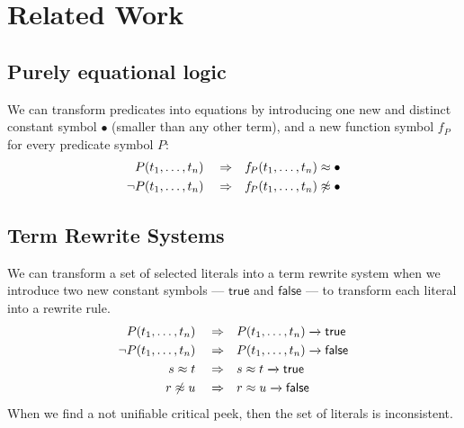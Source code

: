 
\chapter{Related Work}


\section{Purely equational logic}

We can transform predicates into equations
by introducing one new and distinct constant symbol \( \bullet \) (smaller than any other term),
and a new function symbol \( f\!_P \) for every predicate symbol \( P \):
\begin{align*}
	P(t_1,\ldots,t_n) \quad\Rightarrow&\quad f\!_P(t_1,\ldots,t_n) \approx \bullet \\
	\lnot P(t_1,\ldots,t_n) \quad\Rightarrow&\quad f\!_P(t_1,\ldots,t_n) \not\approx \bullet
\end{align*}

\section{Term Rewrite Systems}

We can transform a set of selected literals into a term rewrite system
when we introduce two new constant symbols --- \( \mathsf{true} \) and \( \mathsf{false} \) ---
to transform each literal into a rewrite rule.
\begin{align*}
P(t_1,\ldots,t_n) \quad\Rightarrow &\quad P(t_1,\ldots,t_n) \xrightarrow[{}]{} \mathsf{true}
\\
\lnot P(t_1,\ldots,t_n) \quad\Rightarrow &\quad P(t_1,\ldots,t_n) \xrightarrow[{}]{} \mathsf{false}
\\
s \approx t \quad\Rightarrow&\quad s \approx t\xrightarrow[{}]{} \mathsf{true}
\\
r \not\approx u \quad\Rightarrow&\quad r \approx u\xrightarrow[{}]{}  \mathsf{false}
\end{align*}
When we find a not unifiable critical peek, then the set of literals is inconsistent.

